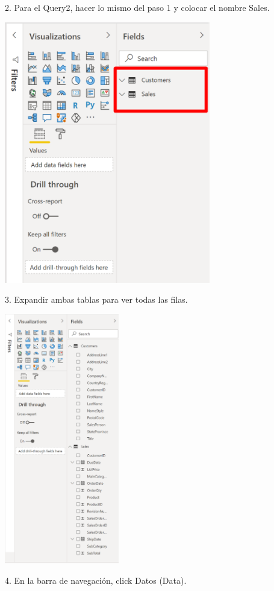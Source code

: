 \documentclass[12pt,letterpaper]{article}
\begin{document}
2. Para el Query2, hacer lo mismo del paso 1 y colocar el nombre Sales.
\begin{center}
    \includegraphics[width=9cm]{img/20.png}
    \vspace{2cm}  
\end{center}
3. Expandir ambas tablas para ver todas las filas.
\begin{center}
    \includegraphics[width=5cm]{img/21.png}  
\end{center}
4. En la barra de navegación, click Datos (Data).
\end{document}
